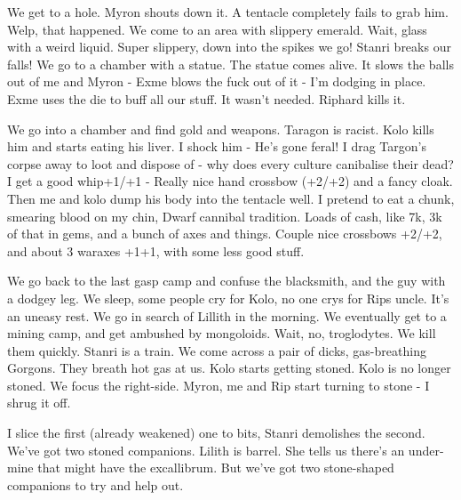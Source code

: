 We get to a hole. Myron shouts down it. A tentacle completely fails to grab him. Welp, that happened. We come to an area with slippery emerald. Wait, glass with a weird liquid. Super slippery, down into the spikes we go! Stanri breaks our falls! We go to a chamber with a statue. The statue comes alive. It slows the balls out of me and Myron - Exme blows the fuck out of it - I’m dodging in place. Exme uses the die to buff all our stuff. It wasn’t needed. Riphard kills it.\medskip

We go into a chamber and find gold and weapons. Taragon is racist. Kolo kills him and starts eating his liver. I shock him - He’s gone feral! I drag Targon’s corpse away to loot and dispose of - why does every culture canibalise their dead? I get a good whip+1/+1 - Really nice hand crossbow (+2/+2) and a fancy cloak. Then me and kolo dump his body into the tentacle well. I pretend to eat a chunk, smearing blood on my chin, Dwarf cannibal tradition. Loads of cash, like 7k, 3k of that in gems, and a bunch of axes and things. Couple nice crossbows +2/+2, and about 3 waraxes +1+1, with some less good stuff.\medskip

We go back to the last gasp camp and confuse the blacksmith, and the guy with a dodgey leg. We sleep, some people cry for Kolo, no one crys for Rips uncle. It’s an uneasy rest. We go in search of Lillith in the morning. We eventually get to a mining camp, and get ambushed by mongoloids. Wait, no, troglodytes. We kill them quickly. Stanri is a train. We come across a pair of dicks, gas-breathing Gorgons. They breath hot gas at us. Kolo starts getting stoned. Kolo is no longer stoned. We focus the right-side. Myron, me and Rip start turning to stone - I shrug it off.\medskip

I slice the first (already weakened) one to bits, Stanri demolishes the second. We’ve got two stoned companions. Lilith is barrel. She tells us there’s an under-mine that might have the excallibrum. But we’ve got two stone-shaped companions to try and help out.\medskip



\vspace*{5mm}


